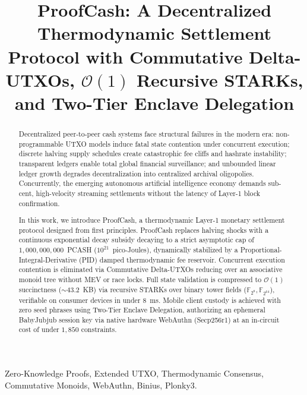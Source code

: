 \documentclass[10pt,conference,letterpaper]{IEEEtran}
\begin{document}
\title{ProofCash: A Decentralized Thermodynamic Settlement Protocol with Commutative Delta-UTXOs, $\mathcal{O}(1)$ Recursive STARKs, and Two-Tier Enclave Delegation}

\author{
}

\maketitle

\begin{abstract}
Decentralized peer-to-peer cash systems face structural failures in the modern era: non-programmable UTXO models induce fatal state contention under concurrent execution; discrete halving supply schedules create catastrophic fee cliffs and hashrate instability; transparent ledgers enable total global financial surveillance; and unbounded linear ledger growth degrades decentralization into centralized archival oligopolies. Concurrently, the emerging autonomous artificial intelligence economy demands sub-cent, high-velocity streaming settlements without the latency of Layer-1 block confirmation.

In this work, we introduce ProofCash, a thermodynamic Layer-1 monetary settlement protocol designed from first principles. ProofCash replaces halving shocks with a continuous exponential decay subsidy decaying to a strict asymptotic cap of $1{,}000{,}000{,}000$~PCASH ($10^{21}$~pico-Joules), dynamically stabilized by a Proportional-Integral-Derivative (PID) damped thermodynamic fee reservoir. Concurrent execution contention is eliminated via Commutative Delta-UTXOs reducing over an associative monoid tree without MEV or race locks. Full state validation is compressed to $\mathcal{O}(1)$ succinctness ($\sim 43.2$~KB) via recursive STARKs over binary tower fields ($\mathbb{F}_{2^8}, \mathbb{F}_{2^{64}}$), verifiable on consumer devices in under $8$~ms. Mobile client custody is achieved with zero seed phrases using Two-Tier Enclave Delegation, authorizing an ephemeral BabyJubjub session key via native hardware WebAuthn (Secp256r1) at an in-circuit cost of under $1{,}850$ constraints.
\end{abstract}

\begin{IEEEkeywords}
Zero-Knowledge Proofs, Extended UTXO, Thermodynamic Consensus, Commutative Monoids, WebAuthn, Binius, Plonky3.
\end{IEEEkeywords}
\end{document}
